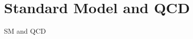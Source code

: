 \documentclass[main.tex]{subfiles}
\begin{document}
\chapter{Standard Model and QCD}
SM and QCD
\end{document}
